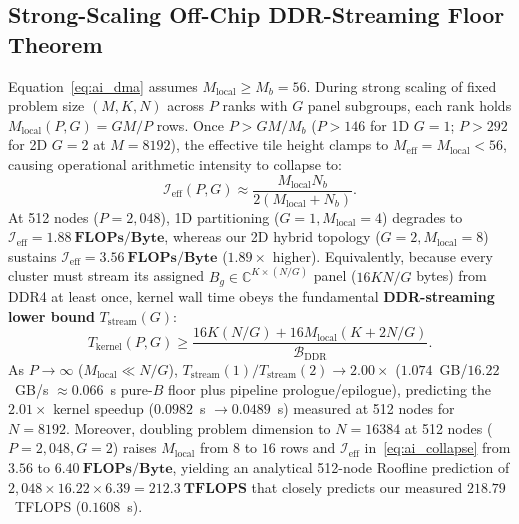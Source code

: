 \documentclass[journal]{IEEEtran}
\begin{document}
\subsection{Strong-Scaling Off-Chip DDR-Streaming Floor Theorem}
Equation~\eqref{eq:ai_dma} assumes $M_{\mathrm{local}} \ge M_b = 56$. During strong scaling of fixed problem size $(M, K, N)$ across $P$ ranks with $G$ panel subgroups, each rank holds $M_{\mathrm{local}}(P, G) = G M / P$ rows. Once $P > G M / M_b$ ($P > 146$ for 1D $G=1$; $P > 292$ for 2D $G=2$ at $M=8192$), the effective tile height clamps to $M_{\mathrm{eff}} = M_{\mathrm{local}} < 56$, causing operational arithmetic intensity to collapse to:
\begin{equation}
\mathcal{I}_{\mathrm{eff}}(P, G) \approx \frac{M_{\mathrm{local}} N_b}{2\left(M_{\mathrm{local}} + N_b\right)}.
\label{eq:ai_collapse}
\end{equation}
At 512 nodes ($P = 2{,}048$), 1D partitioning ($G=1, M_{\mathrm{local}}=4$) degrades to $\mathcal{I}_{\mathrm{eff}} = \mathbf{1.88~\text{FLOPs/Byte}}$, whereas our 2D hybrid topology ($G=2, M_{\mathrm{local}}=8$) sustains $\mathcal{I}_{\mathrm{eff}} = \mathbf{3.56~\text{FLOPs/Byte}}$ ($1.89\times$ higher). Equivalently, because every cluster must stream its assigned $B_g \in \mathbb{C}^{K \times (N/G)}$ panel ($16 K N / G$ bytes) from DDR4 at least once, kernel wall time obeys the fundamental \textbf{DDR-streaming lower bound} $T_{\mathrm{stream}}(G)$:
\begin{equation}
T_{\mathrm{kernel}}(P, G) \ge \frac{16 K (N / G) + 16 M_{\mathrm{local}}(K + 2 N / G)}{\mathcal{B}_{\mathrm{DDR}}}.
\label{eq:ddr_floor}
\end{equation}
As $P \to \infty$ ($M_{\mathrm{local}} \ll N/G$), $T_{\mathrm{stream}}(1) / T_{\mathrm{stream}}(2) \to \mathbf{2.00\times}$ ($1.074$~GB/$16.22$~GB/s $\approx 0.066$~s pure-$B$ floor plus pipeline prologue/epilogue), predicting the $2.01\times$ kernel speedup ($0.0982$~s $\to 0.0489$~s) measured at 512 nodes for $N=8192$. Moreover, doubling problem dimension to $N=16384$ at 512 nodes ($P=2{,}048, G=2$) raises $M_{\mathrm{local}}$ from $8$ to $16$ rows and $\mathcal{I}_{\mathrm{eff}}$ in~\eqref{eq:ai_collapse} from $3.56$ to $\mathbf{6.40~\text{FLOPs/Byte}}$, yielding an analytical 512-node Roofline prediction of $2{,}048 \times 16.22 \times 6.39 = \mathbf{212.3~\text{TFLOPS}}$ that closely predicts our measured $218.79$~TFLOPS ($0.1608$~s).

\end{document}
